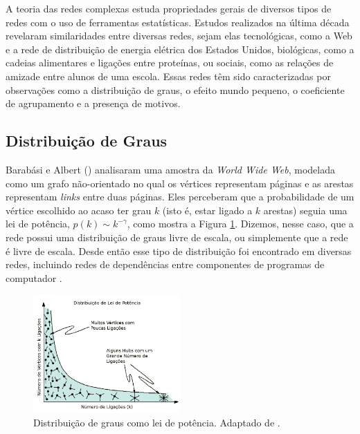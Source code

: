 ﻿\documentclass{article}
\begin{document}
A teoria das redes complexas estuda propriedades gerais de diversos tipos de redes com o uso de ferramentas estatísticas. Estudos realizados na última década revelaram similaridades entre diversas redes, sejam elas tecnológicas, como a Web e a rede de distribuição de energia elétrica dos Estados Unidos, biológicas, como a cadeias alimentares e ligações entre proteínas, ou sociais, como as relações de amizade entre alunos de uma escola. Essas redes têm sido caracterizadas por observações como a distribuição de graus, o efeito mundo pequeno, o coeficiente de agrupamento e a presença de motivos.

\subsection{Distribuição de Graus}

Barabási e Albert (\citeyear{Barabasi1999}) analisaram uma amostra da \textit{World Wide Web}, modelada como um grafo não-orientado no qual os vértices representam páginas e as arestas representam \textit{links} entre duas páginas. Eles perceberam que a probabilidade de um vértice escolhido ao acaso ter grau $k$ (isto é, estar ligado a $k$ arestas) seguia uma lei de potência, $p(k) \sim k^{-\gamma}$, como mostra a Figura \ref{fig:leidepotencia}. Dizemos, nesse caso, que a rede possui uma distribuição de graus livre de escala, ou simplemente que a rede é livre de escala. Desde então esse tipo de distribuição foi encontrado em diversas redes, incluindo redes de dependências entre componentes de programas de computador \cite{Valverde2003}.

\begin{figure} \label{fig:leidepotencia}
\centering
\includegraphics[width=0.5\textwidth]{leidepotencia}
\caption{Distribuição de graus como lei de potência. Adaptado de \cite{Barabasi2007}.}
\end{figure}
\end{document}
